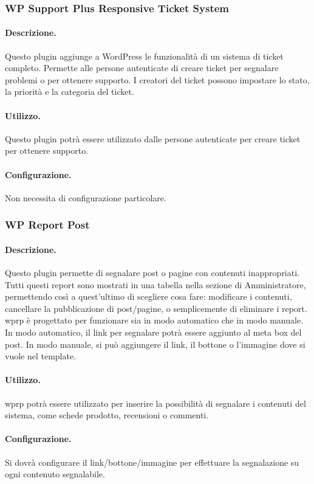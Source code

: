 \subsubsection{WP Support Plus Responsive Ticket System}
\paragraph{Descrizione.} Questo plugin aggiunge a WordPress le funzionalità di un sistema di ticket completo. Permette alle persone autenticate di creare ticket per segnalare problemi o per ottenere supporto. I creatori del ticket possono impostare lo stato, la priorità e la categoria del ticket.
\paragraph{Utilizzo.} Questo plugin potrà essere utilizzato dalle persone autenticate per creare ticket per ottenere supporto.
\paragraph{Configurazione.} Non necessita di configurazione particolare.

\subsubsection{WP Report Post}
\paragraph{Descrizione.} Questo plugin permette di segnalare post o pagine con contenuti inappropriati. Tutti questi report sono mostrati in una tabella nella sezione di Amministratore, permettendo così a quest'ultimo di scegliere cosa fare: modificare i contenuti, cancellare la pubblicazione di post/pagine, o semplicemente di eliminare i report. \gls{wprp} è progettato per funzionare sia in modo automatico che in modo manuale. In modo automatico, il link per segnalare potrà essere aggiunto al meta box del post. In modo manuale, si può aggiungere il link, il bottone o l'immagine dove si vuole nel template.
\paragraph{Utilizzo.} \gls{wprp} potrà essere utilizzato per inserire la possibilità di segnalare i contenuti del sistema, come schede prodotto, recensioni o commenti.
\paragraph{Configurazione.} Si dovrà configurare il link/bottone/immagine per effettuare la segnalazione su ogni contenuto segnalabile.

